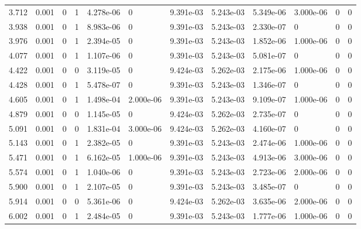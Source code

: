 \documentclass[preview]{standalone}
\begin{document}
{{\begin{tabular}{L{1.2cm}C{1.2cm} C{0.3cm}C{0.5cm} C{1.4cm}C{1.4cm} C{1.4cm}C{1.4cm} C{1.6cm}C{1.6cm} C{1.6cm}C{1.6cm}}
  3.712  &  0.001  & 0     &  1 &  4.278e-06  & 0  &  9.391e-03&   5.243e-03& 5.349e-06 & 3.000e-06   &  0 & 0  \\ 
  3.938  &  0.001  & 0     &  1 &  8.983e-06  & 0  &  9.391e-03&   5.243e-03& 2.330e-07 & 0   &  0 & 0  \\ 
  3.976  &  0.001  & 0     &  1 &  2.394e-05  & 0  &  9.391e-03&   5.243e-03& 1.852e-06 & 1.000e-06   &  0 & 0  \\ 
  4.077  &  0.001  & 0     &  1 &  1.107e-06  & 0  &  9.391e-03&   5.243e-03& 5.081e-07 & 0   &  0 & 0  \\ 
  4.422  &  0.001  & 0     &  0 &  3.119e-05  & 0  &  9.424e-03&   5.262e-03& 2.175e-06 & 1.000e-06   &  0 & 0  \\ 
  4.428  &  0.001  & 0     &  1 &  5.478e-07  & 0  &  9.391e-03&   5.243e-03& 1.346e-07 & 0   &  0 & 0  \\ 
  4.605  &  0.001  & 0     &  1 &  1.498e-04  & 2.000e-06  &  9.391e-03&   5.243e-03& 9.109e-07 & 1.000e-06   &  0 & 0  \\ 
  4.879  &  0.001  & 0     &  0 &  1.145e-05  & 0  &  9.424e-03&   5.262e-03& 2.735e-07 & 0   &  0 & 0  \\ 
  5.091  &  0.001  & 0     &  0 &  1.831e-04  & 3.000e-06  &  9.424e-03&   5.262e-03& 4.160e-07 & 0   &  0 & 0  \\ 
  5.143  &  0.001  & 0     &  1 &  2.382e-05  & 0  &  9.391e-03&   5.243e-03& 2.474e-06 & 1.000e-06   &  0 & 0  \\ 
  5.471  &  0.001  & 0     &  1 &  6.162e-05  & 1.000e-06  &  9.391e-03&   5.243e-03& 4.913e-06 & 3.000e-06   &  0 & 0  \\ 
  5.574  &  0.001  & 0     &  1 &  1.040e-06  & 0  &  9.391e-03&   5.243e-03& 2.723e-06 & 2.000e-06   &  0 & 0  \\ 
  5.900  &  0.001  & 0     &  1 &  2.107e-05  & 0  &  9.391e-03&   5.243e-03& 3.485e-07 & 0   &  0 & 0  \\ 
  5.914  &  0.001  & 0     &  0 &  5.361e-06  & 0  &  9.424e-03&   5.262e-03& 3.635e-06 & 2.000e-06   &  0 & 0  \\ 
  6.002  &  0.001  & 0     &  1 &  2.484e-05  & 0  &  9.391e-03&   5.243e-03& 1.777e-06 & 1.000e-06   &  0 & 0  \\ 
\hline 
\end{tabular} 

}}
\end{document}
